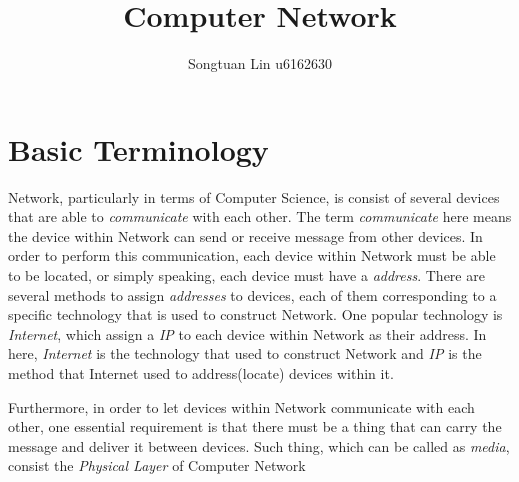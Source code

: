 \documentclass[10pt,a4paper]{article}
\author{Songtuan Lin u6162630}
\title{Computer Network}
\begin{document}
\maketitle

\section{Basic Terminology}
Network, particularly in terms of Computer Science, is consist of several devices that are able to \textit{communicate} with each other. The term \textit{communicate} here means the device within Network can send or receive message from other devices. In order to perform this communication, each device within Network must be able to be located, or simply speaking, each device must have a \textit{address}. There are several methods to assign \textit{addresses} to devices, each of them corresponding to a specific technology that is used to construct Network. One popular technology is \textit{Internet}, which assign a \textit{IP} to each device within Network as their address. In here, \textit{Internet} is the technology that used to construct Network and \textit{IP} is the method that Internet used to address(locate) devices within it. 

Furthermore, in order to let devices within Network communicate with each other, one essential requirement is that there must be a thing that can carry the message and deliver it between devices. Such thing, which can be called as \textit{media}, consist the \textit{Physical Layer} of Computer Network
\end{document}
